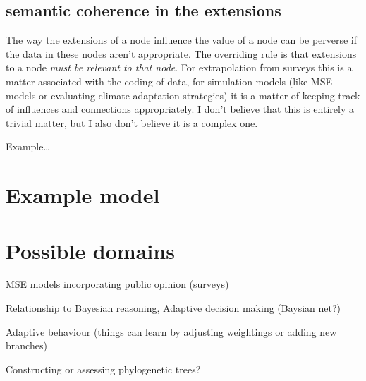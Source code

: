 \subsection{semantic coherence in the extensions}
The way the extensions of a node influence the value of a node can be
perverse if the data in these nodes aren't appropriate.  The
overriding rule is that extensions to a node \emph{must be relevant to
  that node}. For extrapolation from surveys this is a matter
associated with the coding of data, for simulation models (like MSE
models or evaluating climate adaptation strategies) it is a matter of
keeping track of influences and connections appropriately.  I don't
believe that this is entirely a trivial matter, but I also don't
believe it is a complex one.

Example\ldots

\section{Example model}

\section{Possible domains}
MSE models incorporating public opinion (surveys)

Relationship to Bayesian reasoning, Adaptive decision making (Baysian net?)

Adaptive behaviour (things can learn by adjusting weightings or
adding new branches)

Constructing or assessing phylogenetic trees? 





